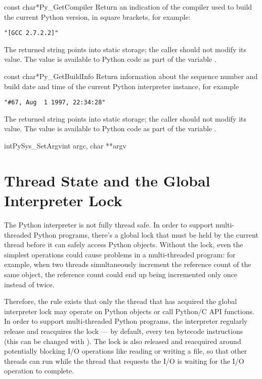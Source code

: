 \documentclass{manual}
\begin{document}
\begin{cfuncdesc}{const char*}{Py_GetCompiler}{}
Return an indication of the compiler used to build the current Python 
version, in square brackets, for example:

\begin{verbatim}
"[GCC 2.7.2.2]"
\end{verbatim}

The returned string points into static storage; the caller should not 
modify its value.  The value is available to Python code as part of 
the variable .
\end{cfuncdesc}

\begin{cfuncdesc}{const char*}{Py_GetBuildInfo}{}
Return information about the sequence number and build date and time 
of the current Python interpreter instance, for example

\begin{verbatim}
"#67, Aug  1 1997, 22:34:28"
\end{verbatim}

The returned string points into static storage; the caller should not 
modify its value.  The value is available to Python code as part of 
the variable .
\end{cfuncdesc}

\begin{cfuncdesc}{int}{PySys_SetArgv}{int argc, char **argv}
\end{cfuncdesc}


\section{Thread State and the Global Interpreter Lock
         \label{threads}}

The Python interpreter is not fully thread safe.  In order to support
multi-threaded Python programs, there's a global lock that must be
held by the current thread before it can safely access Python objects.
Without the lock, even the simplest operations could cause problems in
a multi-threaded program: for example, when two threads simultaneously
increment the reference count of the same object, the reference count
could end up being incremented only once instead of twice.

Therefore, the rule exists that only the thread that has acquired the
global interpreter lock may operate on Python objects or call Python/C
API functions.  In order to support multi-threaded Python programs,
the interpreter regularly release and reacquires the lock --- by
default, every ten bytecode instructions (this can be changed with
).  The lock is also released and
reacquired around potentially blocking I/O operations like reading or
writing a file, so that other threads can run while the thread that
requests the I/O is waiting for the I/O operation to complete.
\end{document}

